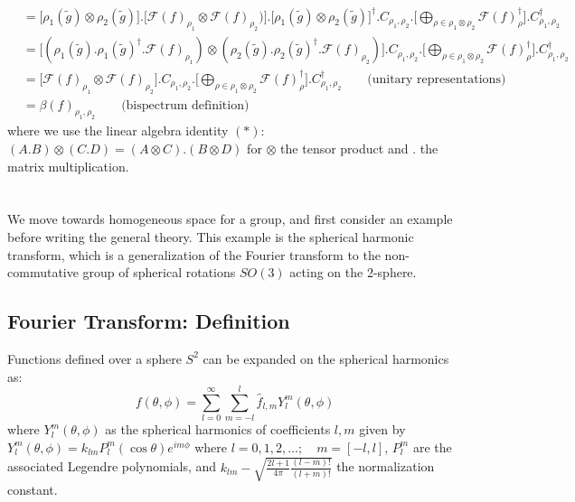 \documentclass{article}
\begin{document}
\begin{align*}
  &=
  \Big[\rho_1(\tilde{g}) \otimes \rho_2(\tilde{g})\Big] .\Big[\mathcal{F}(f)_{\rho_1} \otimes \mathcal{F}(f)_{\rho_2})\Big] .\Big[\rho_1(\tilde{g}) \otimes \rho_2(\tilde{g})\Big]^\dagger. C_{\rho_1,\rho_2}.\Big[\bigoplus_{\rho \in \rho_1 \otimes \rho_2} \mathcal{F}(f)_{\rho}^{\dagger} \Big] .C^{\dagger}_{\rho_1,\rho_2}\\
  &=
  \Big[(\rho_1(\tilde{g}).\rho_1(\tilde{g})^\dagger.\mathcal{F}(f)_{\rho_1}) \otimes (\rho_2(\tilde{g}).\rho_2(\tilde{g})^\dagger. \mathcal{F}(f)_{\rho_2})\Big].  C_{\rho_1,\rho_2}.\Big[\bigoplus_{\rho \in \rho_1 \otimes \rho_2} \mathcal{F}(f)_{\rho}^{\dagger} \Big]. C^{\dagger}_{\rho_1,\rho_2}\\
  &=
  \Big[\mathcal{F}(f)_{\rho_1} \otimes\mathcal{F}(f)_{\rho_2}\Big] . C_{\rho_1,\rho_2}.\Big[\bigoplus_{\rho \in \rho_1 \otimes \rho_2} \mathcal{F}(f)_{\rho}^{\dagger} \Big]. C^{\dagger}_{\rho_1,\rho_2}\qquad \text{(unitary representations)}\\
  &=
  \beta(f)_{\rho_1, \rho_2} \qquad \text{(bispectrum definition)}
\end{align*}
where we use the linear algebra identity $(*)$: $(A.B) \otimes (C.D) = (A\otimes C) . (B \otimes D)$ for $\otimes$ the tensor product and $.$ the matrix multiplication.

\section{\color{purple}{Domain $\Omega = (S^2,~SO(3),~\ast)$ (spherical rotations)}}

We move towards homogeneous space for a group, and first consider an example before writing the general theory. This example is the spherical harmonic transform, which is a generalization of the Fourier transform to the non-commutative group of spherical rotations $SO(3)$ acting on the 2-sphere.

\subsection{Fourier Transform: Definition}
Functions defined over a sphere $S^2$ can be expanded on the spherical harmonics as:
\begin{equation}
    f(\theta, \phi)=\sum_{l=0}^{\infty} \sum_{m=-l}^l \widehat{f}_{l, m} Y_l^m(\theta, \phi)
\end{equation}
where $Y_l^m(\theta, \phi)$ as the spherical harmonics of coefficients $l, m$ given by $Y_l^m(\theta, \phi)=k_{lm} P_l^m(\cos \theta) e^{i m \phi}$
where $l=0,1,2, \ldots ; \quad m=[-l, l]$, $P_l^m$ are the associated Legendre polynomials, and $k_{lm}-\sqrt{\frac{2 l+1}{4 \pi} \frac{(l-m) !}{(l+m) !}}$ the normalization constant.
\end{document}
